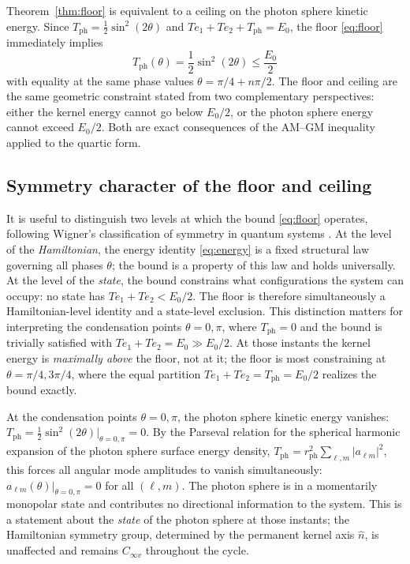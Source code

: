 \documentclass[%
 reprint, amsmath,amssymb, aps, prb, ]{revtex4-2}
\numberwithin{equation}{section}
\begin{document}
Theorem~\ref{thm:floor} is equivalent to a ceiling on the photon sphere kinetic energy. Since $T_\text{ph} = \tfrac{1}{2}\sin^2(2\theta)$ and $Te_1 + Te_2 + T_\text{ph} = E_0$, the floor \eqref{eq:floor} immediately implies
\begin{equation}
T_\text{ph}(\theta) = \frac{1}{2}\sin^2(2\theta) \leq \frac{E_0}{2}
\label{eq:ceiling}
\end{equation}
with equality at the same phase values $\theta = \pi/4 + n\pi/2$. The floor and ceiling are the same geometric constraint stated from two complementary perspectives: either the kernel energy cannot go below $E_0/2$, or the photon sphere energy cannot exceed $E_0/2$. Both are exact consequences of the AM--GM inequality applied to the quartic form.

\subsection{Symmetry character of the floor and ceiling}

It is useful to distinguish two levels at which the bound \eqref{eq:floor} operates, following Wigner's classification of symmetry in quantum systems \cite{wigner1959}. At the level of the \emph{Hamiltonian}, the energy identity \eqref{eq:energy} is a fixed structural law governing all phases $\theta$; the bound is a property of this law and holds universally. At the level of the \emph{state}, the bound constrains what configurations the system can occupy: no state has $Te_1 + Te_2 < E_0/2$. The floor is therefore simultaneously a Hamiltonian-level identity and a state-level exclusion. This distinction matters for interpreting the condensation points $\theta = 0, \pi$, where $T_\text{ph} = 0$ and the bound is trivially satisfied with $Te_1 + Te_2 = E_0 \gg E_0/2$. At those instants the kernel energy is \emph{maximally above} the floor, not at it; the floor is most constraining at $\theta = \pi/4, 3\pi/4$, where the equal partition $Te_1 + Te_2 = T_\text{ph} = E_0/2$ realizes the bound exactly.

At the condensation points $\theta = 0, \pi$, the photon sphere kinetic energy vanishes: $T_\text{ph} = \tfrac{1}{2}\sin^2(2\theta)|_{\theta=0,\pi} = 0$. By the Parseval relation for the spherical harmonic expansion of the photon sphere surface energy density, $T_\text{ph} = r_\text{ph}^2 \sum_{\ell,m}|a_{\ell m}|^2$, this forces all angular mode amplitudes to vanish simultaneously: $a_{\ell m}(\theta)|_{\theta=0,\pi} = 0$ for all $(\ell, m)$. The photon sphere is in a momentarily monopolar state and contributes no directional information to the system. This is a statement about the \emph{state} of the photon sphere at those instants; the Hamiltonian symmetry group, determined by the permanent kernel axis $\hat{n}$, is unaffected and remains $C_{\infty v}$ throughout the cycle.
\end{document}
